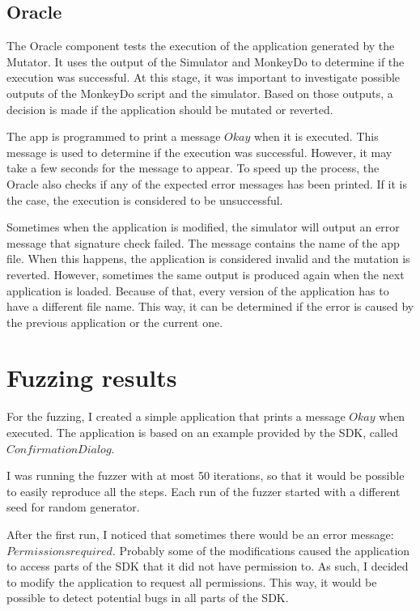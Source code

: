\subsection*{Oracle}
The Oracle component tests the execution of the application generated by the Mutator.
It uses the output of the Simulator and MonkeyDo to determine if the execution was successful.
At this stage, it was important to investigate possible outputs of the MonkeyDo script and the simulator.
Based on those outputs, a decision is made if the application should be mutated or reverted.

The app is programmed to print a message $Okay$ when it is executed.
This message is used to determine if the execution was successful.
However, it may take a few seconds for the message to appear.
To speed up the process, the Oracle also checks if any of the expected error messages has been printed.
If it is the case, the execution is considered to be unsuccessful.

Sometimes when the application is modified, the simulator will output an error message that signature check failed.
The message contains the name of the app file.
When this happens, the application is considered invalid and the mutation is reverted.
However, sometimes the same output is produced again when the next application is loaded.
Because of that, every version of the application has to have a different file name.
This way, it can be determined if the error is caused by the previous application or the current one.


\section{Fuzzing results}

For the fuzzing, I created a simple application that prints a message $Okay$ when executed.
The application is based on an example provided by the SDK, called $Confirmation Dialog$.

I was running the fuzzer with at most 50 iterations, so that it would be possible to easily reproduce all the steps.
Each run of the fuzzer started with a different seed for random generator.

After the first run, I noticed that sometimes there would be an error message: $Permissions required$.
Probably some of the modifications caused the application to access parts of the SDK that it did not have permission to.
As such, I decided to modify the application to request all permissions.
This way, it would be possible to detect potential bugs in all parts of the SDK\@.

